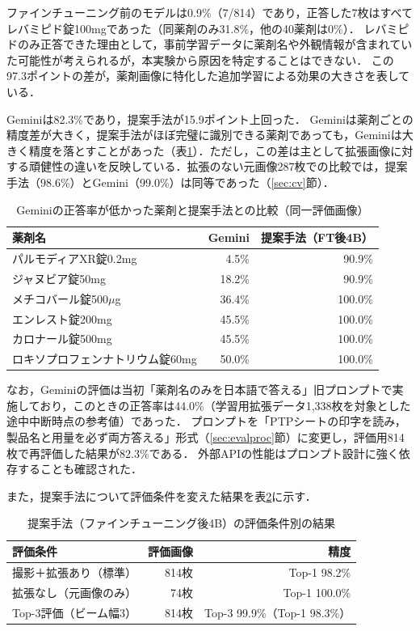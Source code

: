 \documentclass[dvipdfmx]{jsarticle}
\begin{document}
ファインチューニング前のモデルは0.9\%（7/814）であり，正答した7枚はすべてレバミピド錠100mgであった（同薬剤のみ31.8\%，他の40薬剤は0\%）．
レバミピドのみ正答できた理由として，事前学習データに薬剤名や外観情報が含まれていた可能性が考えられるが，本実験から原因を特定することはできない．
この97.3ポイントの差が，薬剤画像に特化した追加学習による効果の大きさを表している．

Geminiは82.3\%であり，提案手法が15.9ポイント上回った．
Geminiは薬剤ごとの精度差が大きく，提案手法がほぼ完璧に識別できる薬剤であっても，Geminiは大きく精度を落とすことがあった（表\ref{tab:gemini_weak}）．ただし，この差は主として拡張画像に対する頑健性の違いを反映している．拡張のない元画像287枚での比較では，提案手法（98.6\%）とGemini（99.0\%）は同等であった（\ref{sec:cv}節）．

\begin{table}[htbp]
\centering
\caption{Geminiの正答率が低かった薬剤と提案手法との比較（同一評価画像）}
\label{tab:gemini_weak}
\small
\begin{tabular}{lrr}
\hline
薬剤名 & Gemini & 提案手法（FT後4B） \\
\hline
パルモディアXR錠0.2mg & 4.5\% & 90.9\% \\
ジャヌビア錠50mg & 18.2\% & 90.9\% \\
メチコバール錠500$\mu$g & 36.4\% & 100.0\% \\
エンレスト錠200mg & 45.5\% & 100.0\% \\
カロナール錠500mg & 45.5\% & 100.0\% \\
ロキソプロフェンナトリウム錠60mg & 50.0\% & 100.0\% \\
\hline
\end{tabular}
\end{table}

なお，Geminiの評価は当初「薬剤名のみを日本語で答える」旧プロンプトで実施しており，このときの正答率は44.0\%（学習用拡張データ1,338枚を対象とした途中中断時点の参考値）であった．
プロンプトを「PTPシートの印字を読み，製品名と用量を必ず両方答える」形式（\ref{sec:evalproc}節）に変更し，評価用814枚で再評価した結果が82.3\%である．
外部APIの性能はプロンプト設計に強く依存することも確認された．

また，提案手法について評価条件を変えた結果を表\ref{tab:single_extra}に示す．

\begin{table}[htbp]
\centering
\caption{提案手法（ファインチューニング後4B）の評価条件別の結果}
\label{tab:single_extra}
\begin{tabular}{lrr}
\hline
評価条件 & 評価画像 & 精度 \\
\hline
撮影＋拡張あり（標準） & 814枚 & Top-1 98.2\% \\
拡張なし（元画像のみ） & 74枚 & Top-1 100.0\% \\
Top-3評価（ビーム幅3） & 814枚 & Top-3 99.9\%（Top-1 98.3\%） \\
\hline
\end{tabular}
\end{table}
\end{document}
